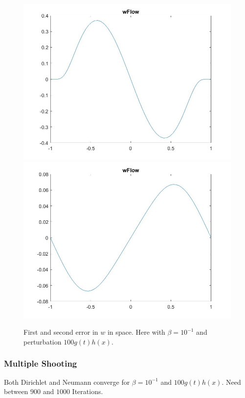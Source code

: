 \documentclass[11pt, a4paper]{article}
\theoremstyle{definition}
\begin{document}
\begin{figure}[h]
	\includegraphics[scale=0.3]{wPertyt7.jpg}
	\includegraphics[scale=0.3]{wPertyt8.jpg}
	\caption{First and second error in $w$ in space. Here with $\beta =10^{-1}$ and perturbation $100g(t)h(x)$.}
	\label{Figgh4}
\end{figure}


\subsubsection*{Multiple Shooting}


Both Dirichlet and Neumann converge for $\beta = 10^{-1}$ and $100g(t)h(x)$. Need between $900$ and $1000$ Iterations. 
 
\end{document}
